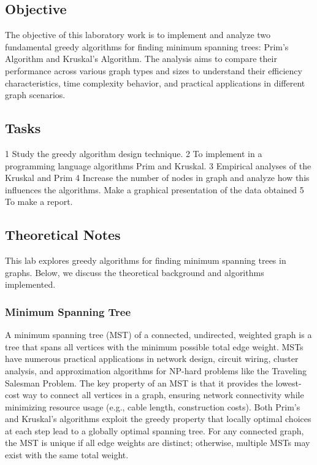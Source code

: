 \documentclass[a4paper,12pt]{article}
\begin{document}
\subsection{Objective}
\label{sec:org536cbc5}
The objective of this laboratory work is to implement and analyze two fundamental greedy algorithms for finding minimum spanning trees: Prim's Algorithm and Kruskal's Algorithm. The analysis aims to compare their performance across various graph types and sizes to understand their efficiency characteristics, time complexity behavior, and practical applications in different graph scenarios.
\subsection{Tasks}
\label{sec:org3f954ef}
1 Study the greedy algorithm design technique.
2 To implement in a programming language algorithms Prim and Kruskal. 
3 Empirical analyses of the Kruskal and Prim
4 Increase the number of nodes in graph and analyze how this influences the algorithms. Make a graphical presentation of the data obtained
5 To make a report.
\subsection{Theoretical Notes}
\label{sec:org01eb287}

This lab explores greedy algorithms for finding minimum spanning trees in graphs. Below, we discuss the theoretical background and algorithms implemented.
\subsubsection{Minimum Spanning Tree}
\label{sec:org7d8a195}
A minimum spanning tree (MST) of a connected, undirected, weighted graph is a tree that spans all vertices with the minimum possible total edge weight. MSTs have numerous practical applications in network design, circuit wiring, cluster analysis, and approximation algorithms for NP-hard problems like the Traveling Salesman Problem. The key property of an MST is that it provides the lowest-cost way to connect all vertices in a graph, ensuring network connectivity while minimizing resource usage (e.g., cable length, construction costs). Both Prim's and Kruskal's algorithms exploit the greedy property that locally optimal choices at each step lead to a globally optimal spanning tree. For any connected graph, the MST is unique if all edge weights are distinct; otherwise, multiple MSTs may exist with the same total weight.
\end{document}
